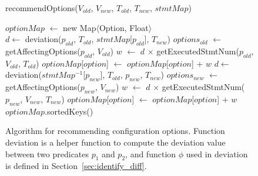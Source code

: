 \begin{figure}[t]
recommendOptions($\mathit{V_{old}}$, $\mathit{V_{new}}$, $\mathit{T_{old}}$, $\mathit{T_{new}}$, $\mathit{stmtMap}$)\\
\vspace{-4mm}%
\begin{algorithmic}[1]
\STATE $\mathit{optionMap}$ $\leftarrow$ new Map$\langle$Option, Float$\rangle$\\
\STATE $\mathit{d} \leftarrow$ deviation($\mathit{p_{old}}$, $\mathit{T_{old}}$, $\mathit{stmtMap}$[$\mathit{p_{old}}$], $\mathit{T_{new}}$)
\STATE $\mathit{options_{old}}$ $\leftarrow$ getAffectingOptions($\mathit{p_{old}}$, $\mathit{V_{old}}$)
\STATE $\mathit{w}$ $\leftarrow$ $\mathit{d}$ $\times$ getExecutedStmtNum($\mathit{p_{old}}$, $\mathit{V_{old}}$, $\mathit{T_{old}}$)
\STATE $\mathit{optionMap}$[$\mathit{option}$] $\leftarrow$ $\mathit{optionMap}$[$\mathit{option}$] + $\mathit{w}$
\ENDFOR
\ENDFOR
{}
\STATE $\mathit{d} \leftarrow$ deviation($\mathit{stmtMap^{-1}}$[$\mathit{p_{new}}$], $\mathit{T_{old}}$, $\mathit{p_{new}}$, $\mathit{T_{new}}$)
\STATE $\mathit{options_{new}}$ $\leftarrow$ getAffectingOptions($\mathit{p_{new}}$, $\mathit{V_{new}}$)
\STATE $\mathit{w}$ $\leftarrow$ $\mathit{d}$ $\times$ getExecutedStmtNum($\mathit{p_{new}}$, $\mathit{V_{new}}$, $\mathit{T_{new}}$)
\STATE $\mathit{optionMap}$[$\mathit{option}$] $\leftarrow$ $\mathit{optionMap}$[$\mathit{option}$] + $\mathit{w}$
\ENDFOR
\ENDFOR
\RETURN $\mathit{optionMap}$.sortedKeys()
\vspace{-2mm}
\end{algorithmic}
\caption{Algorithm for recommending configuration options.
Function deviation is a helper function to compute the deviation
value between two predicates $\mathit{p_1}$ and $\mathit{p_2}$, and function $\phi$
used in deviation is defined in Section~\ref{sec:identify_diff}.
\label{fig:recommend}
}


\end{figure}

